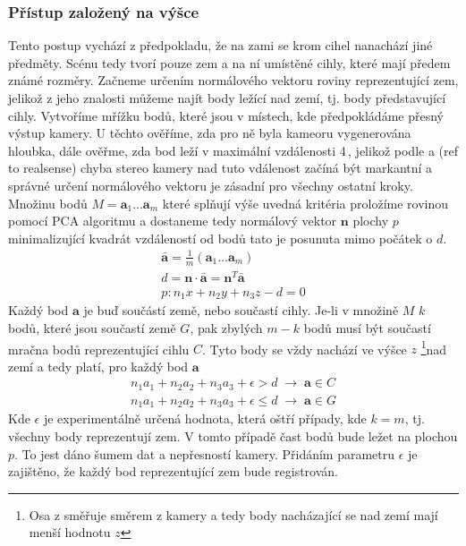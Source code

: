 \documentclass[twoside]{ctuthesis}
\newcommand{\tl}[1]{$\mathbf{#1}$}
\begin{document}
\subsubsection{Přístup založený na výšce}
Tento postup vychází z předpokladu, že na zami se krom cihel nanachází jiné předměty. Scénu tedy tvorí pouze zem a na ní umístěné cihly, které mají předem známé rozměry. Začneme určením normálového vektoru roviny reprezentující zem, jelikož z jeho znalosti můžeme najít body ležící nad zemí, tj. body představující cihly. 
Vytvoříme mřížku bodů, které jsou v místech, kde předpokládáme přesný výstup kamery. U těchto ověříme, zda pro ně byla kameoru vygenerována hloubka, dále ověřme, zda bod leží v maximální vzdálenosti 4\,, jelikož podle \cite{} a (ref to realsense) chyba stereo kamery nad tuto vdálenost začíná být markantní a správné určení normálového vektoru je zásadní pro všechny ostatní kroky. Množinu bodů $M = \mathbf{a}_1 \dotsc \mathbf{a}_m$ které splňují výše uvedná kritéria proložíme rovinou pomocí PCA algoritmu a dostaneme tedy normálový vektor \tl{n} plochy $p$ minimalizující kvadrát vzdáleností od bodů tato je posunuta mimo počátek o $d$.
\begin{align}
    \mathbf{\bar{a}} = \frac{1}{m}\left( \mathbf{a}_1 \dotsc \mathbf{a}_m \right) \\
    d = \mathbf{n} \cdot \mathbf{\bar{a}} = \mathbf{n}^T \mathbf{\bar{a}} \\
    p: n_1x + n_2y + n_3z - d = 0 \label{normal_plane}
\end{align}
Každý bod \tl{a} je buď součástí země, nebo součastí cihly. Je-li v množině $M$ $k$ bodů, které jsou součastí země $G$, pak zbylých $m - k$ bodů musí být součastí mračna bodů reprezentující cihlu $C$. Tyto body se vždy nachází ve výšce $z$ \footnote{Osa z směřuje směrem z kamery a tedy body nacházající se nad zemí mají menší hodnotu $z$}nad zemí a tedy platí, pro každý bod \tl{a}
\begin{align}
    n_1a_1 + n_2a_2 + n_3a_3 + \epsilon > d \; \rightarrow \; \mathbf{a} \in C  \\
    n_1a_1 + n_2a_2 + n_3a_3 + \epsilon \leq d \; \rightarrow \; \mathbf{a} \in G  
\end{align}
Kde $\epsilon$ je experimentálně určená hodnota, která oštří případy, kde $k = m$, tj. všechny body reprezentují zem. V tomto případě čast bodů bude ležet na plochou $p$. To jest dáno šumem dat a nepřesností kamery. Přidáním parametru $\epsilon$ je zajištěno, že každý bod reprezentující zem bude registrován.
\end{document}
